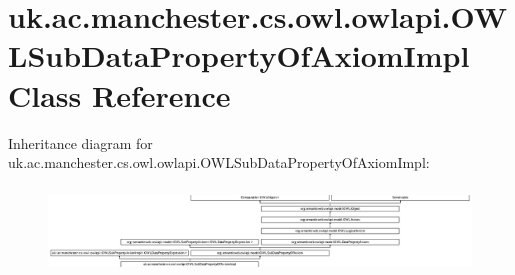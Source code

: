 \hypertarget{classuk_1_1ac_1_1manchester_1_1cs_1_1owl_1_1owlapi_1_1_o_w_l_sub_data_property_of_axiom_impl}{\section{uk.\-ac.\-manchester.\-cs.\-owl.\-owlapi.\-O\-W\-L\-Sub\-Data\-Property\-Of\-Axiom\-Impl Class Reference}
\label{classuk_1_1ac_1_1manchester_1_1cs_1_1owl_1_1owlapi_1_1_o_w_l_sub_data_property_of_axiom_impl}
}
Inheritance diagram for uk.\-ac.\-manchester.\-cs.\-owl.\-owlapi.\-O\-W\-L\-Sub\-Data\-Property\-Of\-Axiom\-Impl\-:\begin{figure}[H]
\begin{center}
\leavevmode
\includegraphics[height=2.333333cm]{classuk_1_1ac_1_1manchester_1_1cs_1_1owl_1_1owlapi_1_1_o_w_l_sub_data_property_of_axiom_impl}
\end{center}
\end{figure}
